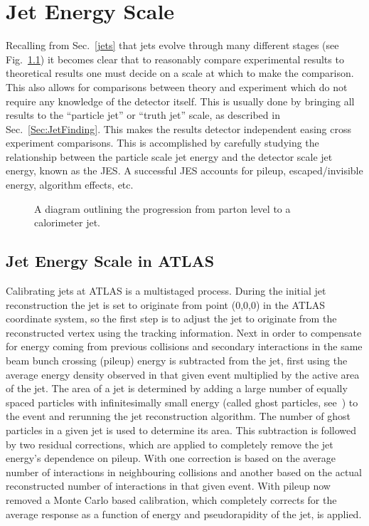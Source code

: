 \chapter{Jet Energy Scale}
\label{JES}

Recalling from Sec.~\ref{jets} that jets evolve through many different stages (see Fig.~\ref{JetLevelsFig}) it becomes clear that to reasonably compare experimental results to theoretical results one must decide on a scale at which to make the comparison.  
This also allows for comparisons between theory and experiment which do not require any knowledge of the detector itself.  
This is usually done by bringing all results to the ``particle jet'' or ``truth jet'' scale, as described in Sec.~\ref{Sec:JetFinding}.  
This makes the results detector independent easing cross experiment comparisons.  
This is accomplished by carefully studying the relationship between the particle scale jet energy and the detector scale jet energy, known as the \gls{JES}.   
A successful \gls{JES} accounts for pileup, escaped/invisible energy, algorithm effects, etc.  


\begin{figure}[!ht]
  \begin{center}
  \end{center}
  \caption[Jet showering evolution.]
      {\small A diagram outlining the progression from parton level to a calorimeter jet.}
  \label{JetLevelsFig}
\end{figure}

\section{Jet Energy Scale in ATLAS}
\label{ATLASJES}

Calibrating jets at ATLAS is a multistaged process.  
During the initial jet reconstruction the jet is set to originate from point (0,0,0) in the ATLAS coordinate system, so the first step is to adjust the jet to originate from the reconstructed vertex using the tracking information.  
Next in order to compensate for energy coming from previous collisions and secondary interactions in the same beam bunch crossing (pileup) energy is subtracted from the jet, first using the average energy density observed in that given event multiplied by the active area of the jet.  
The area of a jet is determined by adding a large number of equally spaced particles with infinitesimally small energy (called ghost particles, see~\cite{Soyez:2012hv}) to the event and rerunning the jet reconstruction algorithm.  
The number of ghost particles in a given jet is used to determine its area.  
This subtraction is followed by two residual corrections, which are applied to completely remove the jet energy's dependence on pileup.  
With one correction is based on the average number of interactions in neighbouring collisions and another based on the actual reconstructed number of interactions in that given event.    
With pileup now removed a Monte Carlo based calibration, which completely corrects for the average response as a function of energy and pseudorapidity of the jet, is applied.  

